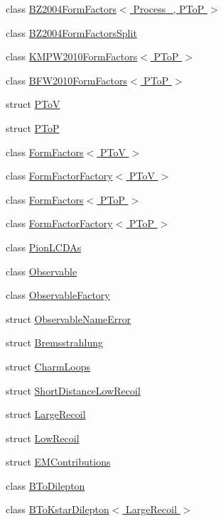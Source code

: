 \begin{DoxyCompactItemize}
\item 
class \hyperlink{classeos_1_1BZ2004FormFactors_3_01Process___00_01PToP_01_4}{BZ2004FormFactors$<$ Process\_\-, PToP $>$}
\item 
class \hyperlink{classeos_1_1BZ2004FormFactorsSplit}{BZ2004FormFactorsSplit}
\item 
class \hyperlink{classeos_1_1KMPW2010FormFactors_3_01PToP_01_4}{KMPW2010FormFactors$<$ PToP $>$}
\item 
class \hyperlink{classeos_1_1BFW2010FormFactors_3_01PToP_01_4}{BFW2010FormFactors$<$ PToP $>$}
\item 
struct \hyperlink{structeos_1_1PToV}{PToV}
\item 
struct \hyperlink{structeos_1_1PToP}{PToP}
\item 
class \hyperlink{classeos_1_1FormFactors_3_01PToV_01_4}{FormFactors$<$ PToV $>$}
\item 
class \hyperlink{classeos_1_1FormFactorFactory_3_01PToV_01_4}{FormFactorFactory$<$ PToV $>$}
\item 
class \hyperlink{classeos_1_1FormFactors_3_01PToP_01_4}{FormFactors$<$ PToP $>$}
\item 
class \hyperlink{classeos_1_1FormFactorFactory_3_01PToP_01_4}{FormFactorFactory$<$ PToP $>$}
\item 
class \hyperlink{classeos_1_1PionLCDAs}{PionLCDAs}
\item 
class \hyperlink{classeos_1_1Observable}{Observable}
\item 
class \hyperlink{classeos_1_1ObservableFactory}{ObservableFactory}
\item 
struct \hyperlink{structeos_1_1ObservableNameError}{ObservableNameError}
\item 
struct \hyperlink{structeos_1_1Bremsstrahlung}{Bremsstrahlung}
\item 
struct \hyperlink{structeos_1_1CharmLoops}{CharmLoops}
\item 
struct \hyperlink{structeos_1_1ShortDistanceLowRecoil}{ShortDistanceLowRecoil}
\item 
struct \hyperlink{structeos_1_1LargeRecoil}{LargeRecoil}
\item 
struct \hyperlink{structeos_1_1LowRecoil}{LowRecoil}
\item 
struct \hyperlink{structeos_1_1EMContributions}{EMContributions}
\item 
class \hyperlink{classeos_1_1BToDilepton}{BToDilepton}
\item 
class \hyperlink{classeos_1_1BToKstarDilepton_3_01LargeRecoil_01_4}{BToKstarDilepton$<$ LargeRecoil $>$}

\end{DoxyCompactItemize}
